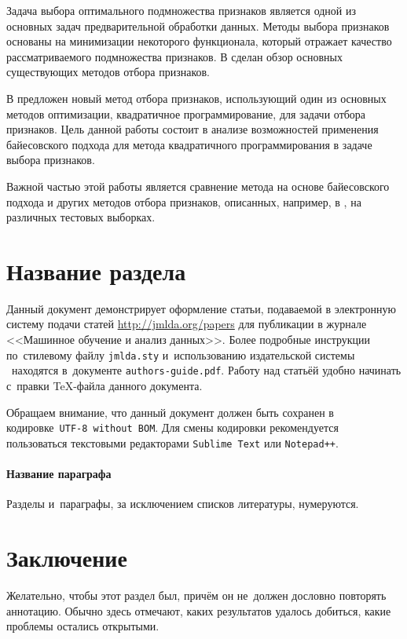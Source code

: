 \documentclass[12pt, twoside]{article}
\begin{document}
Задача выбора оптимального подмножества признаков является одной из основных задач предварительной обработки данных. Методы выбора признаков
основаны на минимизации некоторого функционала, который отражает качество
рассматриваемого подмножества признаков. В \cite{FeatureSelection1, FeatureSelection2} сделан обзор основных существующих методов отбора признаков.

В \cite{KatrutsaS17} предложен новый метод отбора признаков, использующий один из основных методов оптимизации, квадратичное программирование, для задачи отбора признаков. Цель данной работы состоит в анализе возможностей применения байесовского подхода для метода квадратичного программирования в задаче выбора признаков. 

Важной частью этой работы является сравнение метода на основе байесовского подхода и других методов отбора признаков, описанных, например, в \cite{Katrutsa15}, на различных тестовых выборках.

\section{Название раздела}
Данный документ демонстрирует оформление статьи,
подаваемой в электронную систему подачи статей \url{http://jmlda.org/papers} для публикации в журнале <<Машинное обучение и анализ данных>>.
Более подробные инструкции по~стилевому файлу \texttt{jmlda.sty} и~использованию издательской системы \LaTeXe\
находятся в~документе \texttt{authors-guide.pdf}.
Работу над статьёй удобно начинать с~правки \TeX-файла данного документа.

Обращаем внимание, что данный документ должен быть сохранен в кодировке~\verb'UTF-8 without BOM'.
Для смены кодировки рекомендуется пользоваться текстовыми редакторами \verb'Sublime Text' или \verb'Notepad++'.

\paragraph{Название параграфа}
Разделы и~параграфы, за исключением списков литературы, нумеруются.

\section{Заключение}
Желательно, чтобы этот раздел был, причём он не~должен дословно повторять аннотацию.
Обычно здесь отмечают, каких результатов удалось добиться, какие проблемы остались открытыми.






\end{document}
